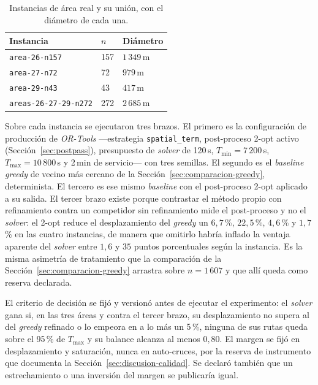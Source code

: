 \begin{table}[H]
  \centering
  \caption{Instancias de área real y su unión, con el diámetro de cada una.}
  \label{tab:areas-instancias}
  \begin{tabularx}{\textwidth}{lXX}
    \toprule
    Instancia & $n$ & Diámetro \\
    \midrule
    \texttt{area-26-n157}         & 157 & $1\,349$\,m \\
    \texttt{area-27-n72}          & 72  & $979$\,m \\
    \texttt{area-29-n43}          & 43  & $417$\,m \\
    \texttt{areas-26-27-29-n272}  & 272 & $2\,685$\,m \\
    \bottomrule
  \end{tabularx}
\end{table}

Sobre cada instancia se ejecutaron tres brazos. El primero es la configuración
de producción de \textit{OR-Tools} ---estrategia \texttt{spatial\_term},
post-proceso 2-opt activo (Sección~\ref{sec:postpass}), presupuesto de
\textit{solver} de 120\,s, $T_{\min} = 7\,200$\,s, $T_{\max} = 10\,800$\,s y
2\,min de servicio--- con tres semillas. El segundo es el \textit{baseline}
\textit{greedy} de vecino más cercano de la
Sección~\ref{sec:comparacion-greedy}, determinista. El tercero es ese mismo
\textit{baseline} con el post-proceso 2-opt aplicado a su salida. El tercer
brazo existe porque contrastar el método propio con refinamiento contra un
competidor sin refinamiento mide el post-proceso y no el \textit{solver}: el
2-opt reduce el desplazamiento del \textit{greedy} un $6{,}7$\,\%, $22{,}5$\,\%,
$4{,}6$\,\% y $1{,}7$\,\% en las cuatro instancias, de manera que omitirlo habría
inflado la ventaja aparente del \textit{solver} entre $1{,}6$ y $35$ puntos
porcentuales según la instancia. Es la misma asimetría de tratamiento que la
comparación de la Sección~\ref{sec:comparacion-greedy} arrastra sobre
$n = 1\,607$ y que allí queda como reserva declarada.

El criterio de decisión se fijó y versionó antes de ejecutar el experimento: el
\textit{solver} gana si, en las tres áreas y contra el tercer brazo, su
desplazamiento no supera al del \textit{greedy} refinado o lo empeora en a lo
más un 5\,\%, ninguna de sus rutas queda sobre el 95\,\% de $T_{\max}$ y su
balance alcanza al menos $0{,}80$. El margen se fijó en desplazamiento y
saturación, nunca en auto-cruces, por la reserva de instrumento que documenta la
Sección~\ref{sec:discusion-calidad}. Se declaró también que un estrechamiento o
una inversión del margen se publicaría igual.

